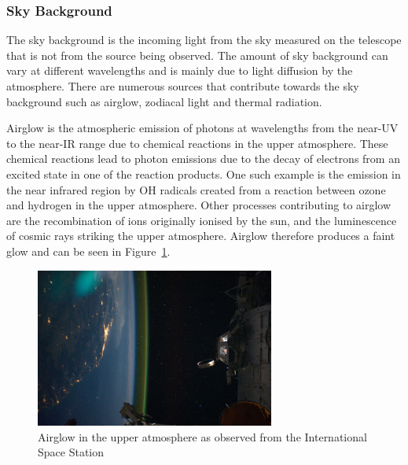 		\subsubsection{Sky Background} %
		\label{ssub:sky_background}
			The sky background is the incoming light from the sky measured on the telescope that is not from the source being observed. The amount of sky background can vary at different wavelengths and is mainly due to light diffusion by the atmosphere. There are numerous sources that contribute towards the sky background such as airglow, zodiacal light and thermal radiation.

			Airglow is the atmospheric emission of photons at wavelengths from the near-UV to the near-IR range due to chemical reactions in the upper atmosphere\cite[p.~9]{An_atmospheric_radiation_model_for_Cerro_Paranal}. These chemical reactions lead to photon emissions due to the decay of electrons from an excited state in one of the reaction products. One such example is the emission in the near infrared region by OH radicals created from a reaction between ozone and hydrogen in the upper atmosphere\cite[p.~1]{MNRMNR11383}. Other processes contributing to airglow are the recombination of ions originally ionised by the sun, and the luminescence of cosmic rays striking the upper atmosphere. Airglow therefore produces a faint glow and can be seen in Figure~\ref{fig:air_glow_in_upper_atmosphere}.
			\begin{figure}[!htbp]
				\centering
				\includegraphics[width=0.7\textwidth]{../Images/airglow_in_upper_atmosphere.jpeg}
				\caption{Airglow in the upper atmosphere as observed from the International Space Station\cite{ISS028_E_050185}}\label{fig:air_glow_in_upper_atmosphere}
			\end{figure}


